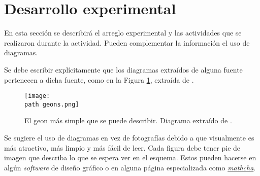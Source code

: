 \section{Desarrollo experimental}
\label{sec:Desarrollo}

En esta sección se describirá el arreglo experimental y las actividades que se realizaron durante la actividad. Pueden complementar la información el uso de diagramas.

Se debe escribir explícitamente que los diagramas extraídos de alguna fuente pertenecen a dicha fuente, como en la Figura \ref{fig:Geons}, extraída de \cite{wheeler1955}.

\begin{figure}[H]
	\centering
	\texttt{[image: \\path geons.png]}
	\caption{El geon más simple que se puede describir. Diagrama extraído de \cite{wheeler1955}.}
	\label{fig:Geons}
\end{figure}

Se sugiere el uso de diagramas en vez de fotografías debido a que visualmente es más atractivo, más limpio y más fácil de leer. Cada figura debe tener pie de imagen que describa lo que se espera ver en el esquema. Estos pueden hacerse en algún \textit{software} de diseño gráfico o en alguna página especializada como \href{https://www.mathcha.io/}{\textit{mathcha}}.